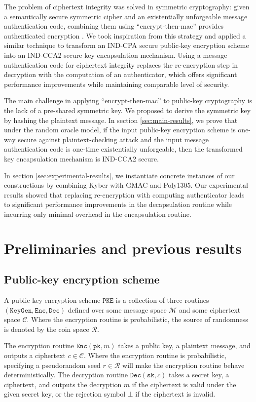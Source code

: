 \documentclass[floatrow,journal=tches,submission]{iacrtrans}
\newcommand{\pke}{\texttt{PKE}}
\newcommand{\keygen}{\texttt{KeyGen}}
\newcommand{\encrypt}{\texttt{Enc}}
\newcommand{\decrypt}{\texttt{Dec}}
\newcommand{\pk}{\texttt{pk}}
\newcommand{\sk}{\texttt{sk}}
\begin{document}
The problem of ciphertext integrity was solved in symmetric cryptography: given a semantically secure symmetric cipher and an existentially unforgeable message authentication code, combining them using ``encrypt-then-mac'' provides authenticated encryption \cite{bellare2000authenticated}. We took inspiration from this strategy and applied a similar technique to transform an IND-CPA secure public-key encryption scheme into an IND-CCA2 secure key encapsulation mechanism. Using a message authentication code for ciphertext integrity replaces the re-encryption step in decryption with the computation of an authenticator, which offers significant performance improvements while maintaining comparable level of security.

The main challenge in applying ``encrypt-then-mac'' to public-key cryptography is the lack of a pre-shared symmetric key. We proposed to derive the symmetric key by hashing the plaintext message. In section \ref{sec:main-results}, we prove that under the random oracle model, if the input public-key encryption scheme is one-way secure against plaintext-checking attack and the input message authentication code is one-time existentially unforgeable, then the transformed key encapsulation mechanism is IND-CCA2 secure.

In section \ref{sec:experimental-results}, we instantiate concrete instances of our constructions by combining Kyber with GMAC and Poly1305. Our experimental results showed that replacing re-encryption with computing authenticator leads to significant performance improvements in the decapsulation routine while incurring only minimal overhead in the encapsulation routine.

\section{Preliminaries and previous results}

\subsection{Public-key encryption scheme}
A public key encryption scheme $\pke$ is a collection of three routines $(\keygen, \encrypt, \decrypt)$ defined over some message space $\mathcal{M}$ and some ciphertext space $\mathcal{C}$. Where the encryption routine is probabilistic, the source of randomness is denoted by the coin space $\mathcal{R}$.

The encryption routine $\encrypt(\pk, m)$ takes a public key, a plaintext message, and outputs a ciphertext $c \in \mathcal{C}$. Where the encryption routine is probabilistic, specifying a pseudorandom seed $r \in \mathcal{R}$ will make the encryption routine behave deterministically. The decryption routine $\decrypt(\sk, c)$ takes a secret key, a ciphertext, and outputs the decryption $\hat{m}$ if the ciphertext is valid under the given secret key, or the rejection symbol $\bot$ if the ciphertext is invalid.
\end{document}
